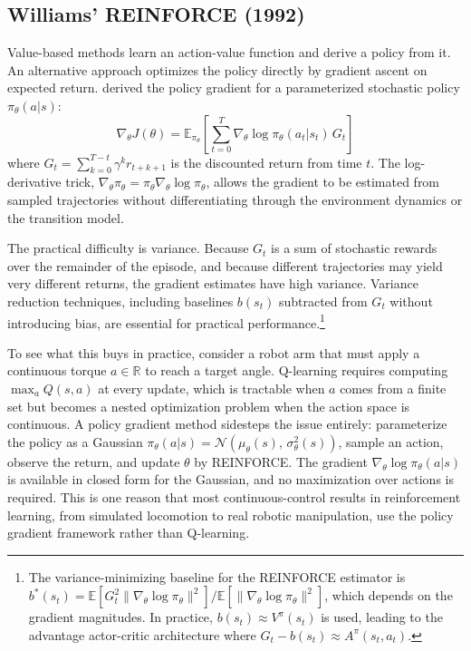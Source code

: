 \subsection{Williams' REINFORCE (1992)}

Value-based methods learn an action-value function and derive a policy from it. An alternative approach optimizes the policy directly by gradient ascent on expected return. \citet{williams1992} derived the policy gradient for a parameterized stochastic policy $\pi_\theta(a|s)$:
\begin{equation}
\nabla_\theta J(\theta) = \mathbb{E}_{\pi_\theta} \left[ \sum_{t=0}^{T} \nabla_\theta \log \pi_\theta(a_t|s_t) \, G_t \right]
\end{equation}
where $G_t = \sum_{k=0}^{T-t} \gamma^k r_{t+k+1}$ is the discounted return from time $t$. The log-derivative trick, $\nabla_\theta \pi_\theta = \pi_\theta \nabla_\theta \log \pi_\theta$, allows the gradient to be estimated from sampled trajectories without differentiating through the environment dynamics or the transition model.

The practical difficulty is variance. Because $G_t$ is a sum of stochastic rewards over the remainder of the episode, and because different trajectories may yield very different returns, the gradient estimates have high variance. Variance reduction techniques, including baselines $b(s_t)$ subtracted from $G_t$ without introducing bias, are essential for practical performance.\footnote{The variance-minimizing baseline for the REINFORCE estimator is $b^*(s_t) = \mathbb{E}[G_t^2 \|\nabla_\theta \log \pi_\theta\|^2] / \mathbb{E}[\|\nabla_\theta \log \pi_\theta\|^2]$, which depends on the gradient magnitudes. In practice, $b(s_t) \approx V^\pi(s_t)$ is used, leading to the advantage actor-critic architecture where $G_t - b(s_t) \approx A^\pi(s_t, a_t)$.}

To see what this buys in practice, consider a robot arm that must apply a continuous torque $a \in \mathbb{R}$ to reach a target angle. Q-learning requires computing $\max_a Q(s,a)$ at every update, which is tractable when $a$ comes from a finite set but becomes a nested optimization problem when the action space is continuous. A policy gradient method sidesteps the issue entirely: parameterize the policy as a Gaussian $\pi_\theta(a|s) = \mathcal{N}(\mu_\theta(s),\, \sigma_\theta^2(s))$, sample an action, observe the return, and update $\theta$ by REINFORCE. The gradient $\nabla_\theta \log \pi_\theta(a|s)$ is available in closed form for the Gaussian, and no maximization over actions is required. This is one reason that most continuous-control results in reinforcement learning, from simulated locomotion to real robotic manipulation, use the policy gradient framework rather than Q-learning.

